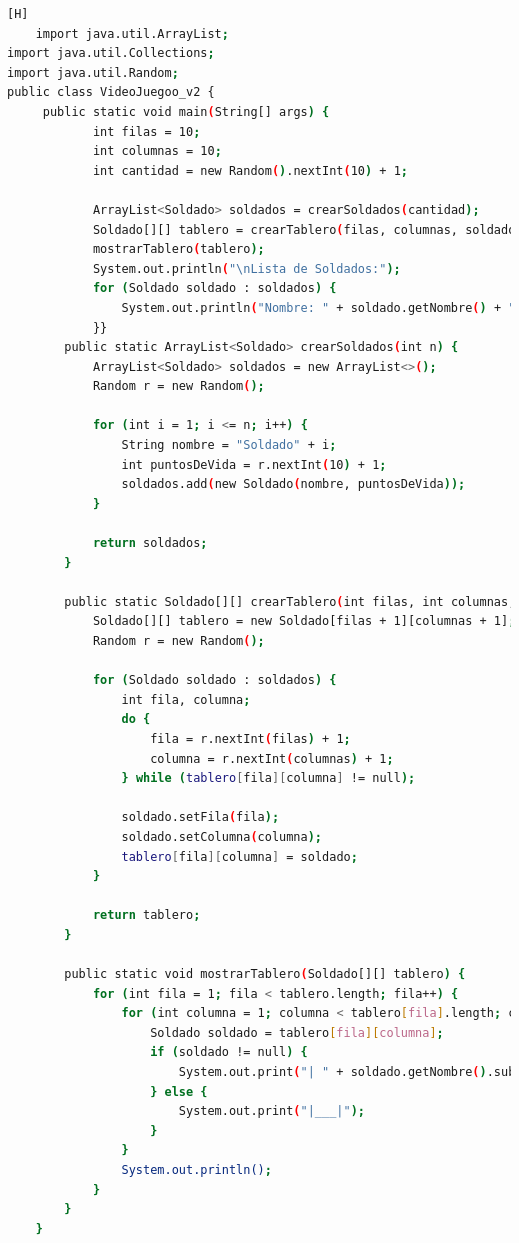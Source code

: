 \documentclass{article}
\begin{document}
	\begin{lstlisting}[language=bash,caption={Creando la clase principal de VideoJuego_v2.java}][H]
	import java.util.ArrayList;
import java.util.Collections;
import java.util.Random;
public class VideoJuegoo_v2 {
	 public static void main(String[] args) {
	        int filas = 10; 
	        int columnas = 10; 
	        int cantidad = new Random().nextInt(10) + 1;

	        ArrayList<Soldado> soldados = crearSoldados(cantidad);
	        Soldado[][] tablero = crearTablero(filas, columnas, soldados);  
	        mostrarTablero(tablero);     
	        System.out.println("\nLista de Soldados:");
	        for (Soldado soldado : soldados) {
	            System.out.println("Nombre: " + soldado.getNombre() + ", Vida: " + soldado.getPuntosDeVida() + ", Fila: " + soldado.getFila() + ", Columna: " + soldado.getColumna());
	        }}
	    public static ArrayList<Soldado> crearSoldados(int n) {
	        ArrayList<Soldado> soldados = new ArrayList<>();
	        Random r = new Random();

	        for (int i = 1; i <= n; i++) {
	            String nombre = "Soldado" + i;
	            int puntosDeVida = r.nextInt(10) + 1; 
	            soldados.add(new Soldado(nombre, puntosDeVida));
	        }

	        return soldados;
	    }

	    public static Soldado[][] crearTablero(int filas, int columnas, ArrayList<Soldado> soldados) {
	        Soldado[][] tablero = new Soldado[filas + 1][columnas + 1];
	        Random r = new Random();

	        for (Soldado soldado : soldados) {
	            int fila, columna;
	            do {
	                fila = r.nextInt(filas) + 1; 
	                columna = r.nextInt(columnas) + 1; 
	            } while (tablero[fila][columna] != null);

	            soldado.setFila(fila);
	            soldado.setColumna(columna);
	            tablero[fila][columna] = soldado;
	        }

	        return tablero;
	    }

	    public static void mostrarTablero(Soldado[][] tablero) {
	        for (int fila = 1; fila < tablero.length; fila++) { 
	            for (int columna = 1; columna < tablero[fila].length; columna++) { 
	                Soldado soldado = tablero[fila][columna];
	                if (soldado != null) {
	                    System.out.print("| " + soldado.getNombre().substring(7) + " |");
	                } else {
	                    System.out.print("|___|");
	                }
	            }
	            System.out.println();
	        }
	    }
	}
	
	
				\end{lstlisting}
			
\end{document}
